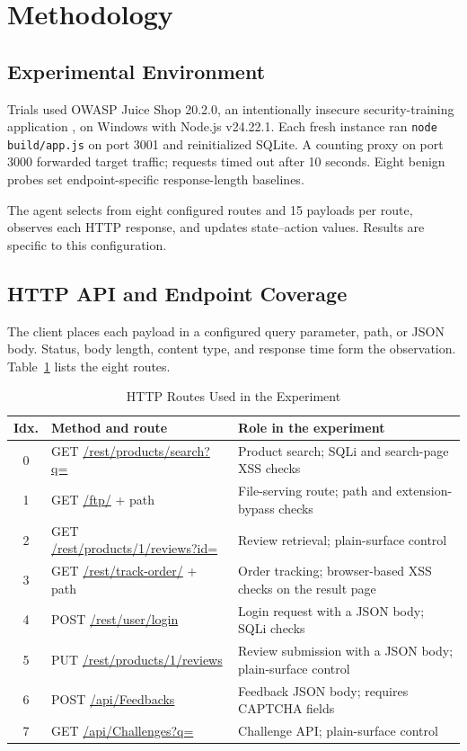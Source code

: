 \documentclass[conference, a4paper]{IEEEtran}
\begin{document}
\section{Methodology}

\subsection{Experimental Environment}

Trials used OWASP Juice Shop 20.2.0, an intentionally insecure
security-training application \cite{juiceshop}, on Windows with
Node.js v24.22.1. Each fresh instance ran
\texttt{node build/app.js} on port 3001 and reinitialized SQLite.
A counting proxy on port 3000 forwarded target traffic; requests
timed out after 10 seconds. Eight benign probes set endpoint-specific
response-length baselines.

The agent selects from eight configured routes and 15 payloads
per route, observes each HTTP response, and updates state--action
values. Results are specific to this configuration.

\subsection{HTTP API and Endpoint Coverage}

The client places each payload in a configured query parameter,
path, or JSON body. Status, body length, content type, and response
time form the observation. Table~\ref{tab:api-endpoints} lists the
eight routes.

\begin{table}[!t]
\caption{HTTP Routes Used in the Experiment}
\label{tab:api-endpoints}
\centering
\footnotesize
\setlength{\tabcolsep}{3pt}
\begin{tabular}{c p{} p{}}
\toprule
\textbf{Idx.} & \textbf{Method and route} & \textbf{Role in the experiment}\\
\midrule
0 & GET \url{/rest/products/search?q=} & Product search; SQLi and search-page XSS checks\\
1 & GET \url{/ftp/} + path & File-serving route; path and extension-bypass checks\\
2 & GET \url{/rest/products/1/reviews?id=} & Review retrieval; plain-surface control\\
3 & GET \url{/rest/track-order/} + path & Order tracking; browser-based XSS checks on the result page\\
4 & POST \url{/rest/user/login} & Login request with a JSON body; SQLi checks\\
5 & PUT \url{/rest/products/1/reviews} & Review submission with a JSON body; plain-surface control\\
6 & POST \url{/api/Feedbacks} & Feedback JSON body; requires CAPTCHA fields\\
7 & GET \url{/api/Challenges?q=} & Challenge API; plain-surface control\\
\bottomrule
\end{tabular}
\end{table}
\setlength{\tabcolsep}{6pt}
\end{document}
